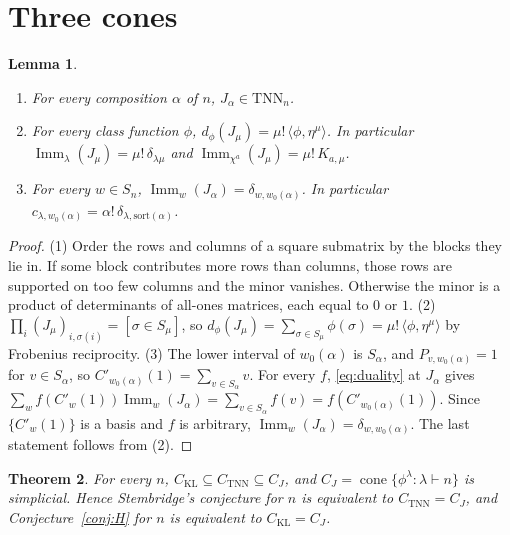 \documentclass[11pt]{amsart}
\newtheorem{theorem}{Theorem}[section]
\newtheorem{lemma}[theorem]{Lemma}
\theoremstyle{definition}
\theoremstyle{remark}
\newcommand{\Imm}{\operatorname{Imm}}
\newcommand{\TNN}{\mathrm{TNN}}
\newcommand{\CKL}{C_{\mathrm{KL}}}
\newcommand{\CTNN}{C_{\mathrm{TNN}}}
\newcommand{\CJ}{C_{J}}
\newcommand{\Cp}[1]{C'_{#1}(1)}
\begin{document}
\section{Three cones}\label{sec:cones}

\begin{lemma}\label{lem:J}
\begin{enumerate}
\item For every composition $\alpha$ of $n$, $J_\alpha\in\TNN_n$.
\item For every class function $\phi$, $d_\phi(J_\mu)=\mu!\,\langle\phi,\eta^\mu\rangle$. In particular $\Imm_\lambda(J_\mu)=\mu!\,\delta_{\lambda\mu}$ and $\Imm_{\chi^a}(J_\mu)=\mu!\,K_{a,\mu}$.
\item For every $w\in S_n$, $\Imm_w(J_\alpha)=\delta_{w,w_0(\alpha)}$. In particular $c_{\lambda,w_0(\alpha)}=\alpha!\,\delta_{\lambda,\mathrm{sort}(\alpha)}$.
\end{enumerate}
\end{lemma}

\begin{proof}
(1) Order the rows and columns of a square submatrix by the blocks they lie in. If some block contributes more rows than columns, those rows are supported on too few columns and the minor vanishes. Otherwise the minor is a product of determinants of all-ones matrices, each equal to $0$ or $1$.
(2) $\prod_i(J_\mu)_{i,\sigma(i)}=[\sigma\in S_\mu]$, so $d_\phi(J_\mu)=\sum_{\sigma\in S_\mu}\phi(\sigma)=\mu!\,\langle\phi,\eta^\mu\rangle$ by Frobenius reciprocity.
(3) The lower interval of $w_0(\alpha)$ is $S_\alpha$, and $P_{v,w_0(\alpha)}=1$ for $v\in S_\alpha$, so $\Cp{w_0(\alpha)}=\sum_{v\in S_\alpha}v$. For every $f$, \eqref{eq:duality} at $J_\alpha$ gives $\sum_wf(\Cp w)\Imm_w(J_\alpha)=\sum_{v\in S_\alpha}f(v)=f(\Cp{w_0(\alpha)})$. Since $\{\Cp w\}$ is a basis and $f$ is arbitrary, $\Imm_w(J_\alpha)=\delta_{w,w_0(\alpha)}$. The last statement follows from (2).
\end{proof}

\begin{theorem}\label{thm:cones}
For every $n$, $\CKL\subseteq\CTNN\subseteq\CJ$, and $\CJ=\operatorname{cone}\{\phi^\lambda:\lambda\vdash n\}$ is simplicial. Hence Stembridge's conjecture for $n$ is equivalent to $\CTNN=\CJ$, and Conjecture~\ref{conj:H} for $n$ is equivalent to $\CKL=\CJ$.
\end{theorem}
\end{document}
